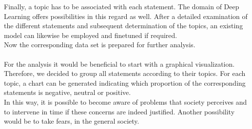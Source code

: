 Finally, a topic has to be associated with each statement.
The domain of Deep Learning offers possibilities in this regard as well.
After a detailed examination of the different statements and subsequent determination of the topics, an existing model can likewise be employed and finetuned if required.
\\
Now the corresponding data set is prepared for further analysis.
\\
\\
For the analysis it would be beneficial to start with a graphical visualization.
Therefore, we decided to group all statements according to their topics.
For each topic, a chart can be generated indicating which proportion of the corresponding statements is negative, neutral or positive.
\\
In this way, it is possible to become aware of problems that society perceives and to intervene in time if these concerns are indeed justified. Another possibility would be to take fears, in the general society.

\begin{table}[t]
    \centering
\caption{\label{data-schema}
Data schema for visualization and analysis
}
\end{table}

